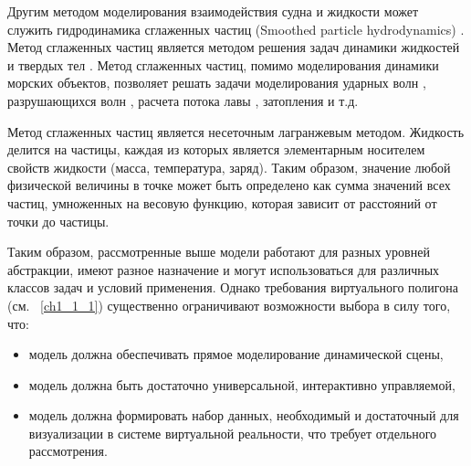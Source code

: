 Другим методом моделирования взаимодействия судна и жидкости может служить гидродинамика сглаженных частиц (Smoothed particle hydrodynamics) \citep{dk45}. Метод сглаженных частиц является методом решения задач динамики жидкостей и твердых тел \citep{dk46}. Метод сглаженных частиц, помимо моделирования динамики морских объектов, позволяет решать задачи моделирования ударных волн \citep{dk47}, разрушающихся волн \citep{dk48}, расчета потока лавы \citep{dk49}, затопления \citep{dk50} и т.д.

Метод сглаженных частиц является несеточным лагранжевым методом. Жидкость делится на частицы, каждая из которых является элементарным носителем свойств жидкости (масса, температура, заряд). Таким образом, значение любой физической величины в точке может быть определено как сумма значений всех частиц, умноженных на весовую функцию, которая зависит от расстояний от точки до частицы.

Таким образом, рассмотренные выше модели работают для разных уровней абстракции, имеют разное назначение и могут использоваться для различных классов задач и условий применения. Однако требования виртуального полигона (см. ~\ref{ch1_1_1}) существенно ограничивают возможности выбора в силу того, что:
\begin{itemize}
	\item модель должна обеспечивать прямое моделирование динамической сцены,
	\item модель должна быть достаточно универсальной, интерактивно управляемой,
	\item модель должна формировать набор данных, необходимый и достаточный для визуализации в системе виртуальной реальности, что требует отдельного рассмотрения.
\end{itemize}
